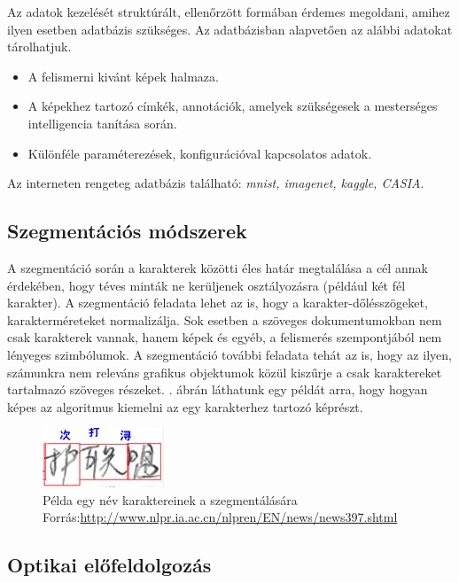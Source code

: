 Az adatok kezelését struktúrált, ellenőrzött formában érdemes megoldani, amihez ilyen esetben adatbázis szükséges. Az adatbázisban alapvetően az alábbi adatokat tárolhatjuk.

\begin{itemize}
\item A felismerni kivánt képek halmaza. 
\item A képekhez tartozó címkék, annotációk, amelyek szükségesek a mesterséges intelligencia tanítása során.
\item Különféle paraméterezések, konfigurációval kapcsolatos adatok.
\end{itemize}

Az interneten rengeteg adatbázis található: \textit{mnist, imagenet, kaggle, CASIA}.

\subsection{Szegmentációs módszerek}

A szegmentáció során a karakterek közötti éles határ megtalálása a cél annak érdekében, hogy téves minták ne kerüljenek osztályozásra (például két fél karakter). A szegmentáció feladata lehet az is, hogy a karakter-dőlésszögeket, karakterméreteket normalizálja. Sok esetben a szöveges dokumentumokban nem csak karakterek vannak, hanem képek és egyéb, a felismerés szempontjából nem lényeges szimbólumok. A szegmentáció további feladata tehát az is, hogy az ilyen, számunkra nem releváns grafikus objektumok közül kiszűrje a csak karaktereket tartalmazó szöveges részeket. . ábrán láthatunk egy példát arra, hogy hogyan képes az algoritmus kiemelni az egy karakterhez tartozó képrészt.

\begin{figure}[h]
\centering
\captionsetup{justification=centering}
\includegraphics[scale=1.15]{images/chinese_char_segmentation}
\caption{Példa egy név karaktereinek a szegmentálására
\hspace{\textwidth}Forrás:\url{http://www.nlpr.ia.ac.cn/nlpren/EN/news/news397.shtml}}
\label{fig:ocr_segmentation}
\end{figure}

\subsection{Optikai előfeldolgozás}

